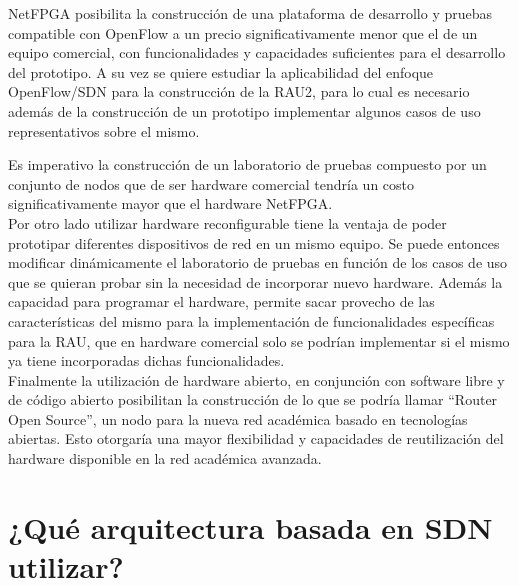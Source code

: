 NetFPGA posibilita la construcci\'on de una plataforma de desarrollo y pruebas compatible con OpenFlow a un precio significativamente menor que el de un equipo comercial, con funcionalidades y capacidades suficientes para el desarrollo del prototipo. A su vez se quiere estudiar la aplicabilidad del enfoque OpenFlow/SDN para la construcción de la RAU2, para lo cual es necesario adem\'as de la construcción de un prototipo implementar algunos casos de uso representativos sobre el mismo. 

Es imperativo la construcción de un laboratorio de pruebas compuesto por un conjunto de nodos que de ser hardware comercial tendría un costo significativamente mayor que el hardware NetFPGA.\\

Por otro lado utilizar hardware reconfigurable tiene la ventaja de poder prototipar diferentes dispositivos de red en un mismo equipo. Se puede entonces modificar din\'amicamente el laboratorio de pruebas en función de los casos de uso que se quieran probar sin la necesidad de incorporar nuevo hardware. Adem\'as la capacidad para programar el hardware, permite sacar provecho de las características del mismo para la implementaci\'on de funcionalidades espec\'ificas para la RAU, que en hardware comercial solo se podrían implementar si el mismo ya tiene incorporadas dichas funcionalidades.\\

Finalmente la utilizaci\'on de hardware abierto, en conjunci\'on con software libre y de código abierto posibilitan la construcci\'on de lo que se podría llamar “Router Open Source”, un nodo para la nueva red académica basado en tecnologías abiertas. Esto otorgaría una mayor flexibilidad y capacidades de reutilizaci\'on del hardware disponible en la red académica avanzada.

\section[¿Qu\'e arquitectura basada en SDN utilizar?]{¿Qu\'e arquitectura basada en SDN utilizar?}


 
